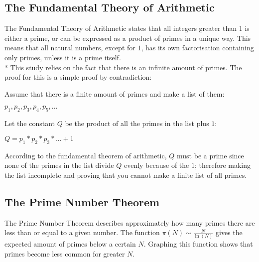 \documentclass[main.tex]{subfiles}
\begin{document}
\subsection{The Fundamental Theory of Arithmetic} \label{arithmetic} The
Fundamental Theory of Arithmetic \cite{theorem:arithmetic} states that all
integers greater than $1$ is either a prime, or can be expressed as a product of
primes in a unique way. This means that all natural numbers, except for $1$, has
its own factorisation containing only primes, unless it is a prime itself.
\newline
\\*
This study relies on the fact that there is an infinite amount of primes. The
proof for this is a simple proof by contradiction:
\newpage
\begin{mdframed}
  \begin{center}
    Assume that there is a finite amount of primes and make a list of them:
  \end{center}

  \begin{center}
    $p_1, p_2, p_3, p_4, p_5, ...$
  \end{center}

  \begin{center}
    Let the constant $Q$ be the product of all the primes in the list plus $1$:
  \end{center}

  \begin{center}
    $Q = p_1 * p_2 * p_3 * ... + 1$
  \end{center}

  \centering
  According to the fundamental theorem of arithmetic, $Q$ must be a prime since
  none of the primes in the list divide $Q$ evenly because of the $1$; therefore
  making the list incomplete and proving that you cannot make a finite list of
  all primes.
\end{mdframed}
\vspace{5mm}

\newpage

\subsection{The Prime Number Theorem}
The Prime Number Theorem \cite{theorem:prime_num} describes approximately how
many primes there are less than or equal to a given number. The function $\pi(N)
\sim \frac{N}{\ln(N)}$ gives the expected amount of primes below a certain $N$.
Graphing this function shows that primes become less common for greater $N$. \\
\end{document}
